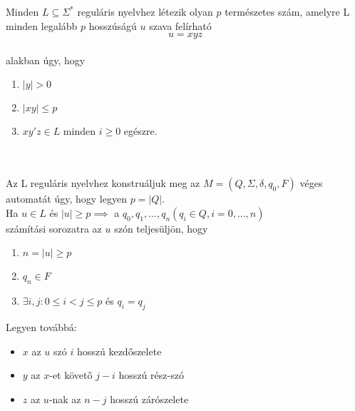 \begin{frame}
\begin{tcolorbox}[title={Tétel: Pumpáló lemma reguláris nyelvre}]
Minden $L \subseteq {\Sigma}^*$ reguláris nyelvhez létezik olyan $p$ természetes szám, amelyre L minden legalább $p$ hosszúságú $u$ szava felírható $$u = xyz$$\\
alakban úgy, hogy\\
\begin{enumerate}
\item $|y| > 0$
\item $|xy| \leq p$
\item $xy'z \in L$ minden $i \geq 0$ egészre.
\end{enumerate}
\tcblower
\msmallskip
\underline{}\\
\mmedskip
\\
Az L reguláris nyelvhez konstruáljuk meg az $M = (Q, {\Sigma}, {\delta}, q_0, F)$ véges automatát úgy, hogy legyen $p = |Q|$.\\
Ha $u \in L$ és $|u| \geq p \implies$ a $q_0, q_1, ...,q_n (q_i \in Q, i = 0, ..., n)$\\
számítási sorozatra az $u$ szón teljesüljön, hogy\\
\begin{enumerate}
\item $n = |u| \geq p$
\item $q_n \in F$
\item ${\exists}i, j : 0 \leq i < j \leq p$ és $q_i = q_j$
\end{enumerate}
\mbigskip
Legyen továbbá:
\begin{itemize}
\item $x$ az $u$ szó $i$ hosszú kezdőszelete
\item $y$ az $x$-et követő $j - i$ hosszú rész-szó
\item $z$ az $u$-nak az $n - j$ hosszú zárószelete 
\end{itemize}
\mbigskip
{}
\end{tcolorbox}

\end{frame}

